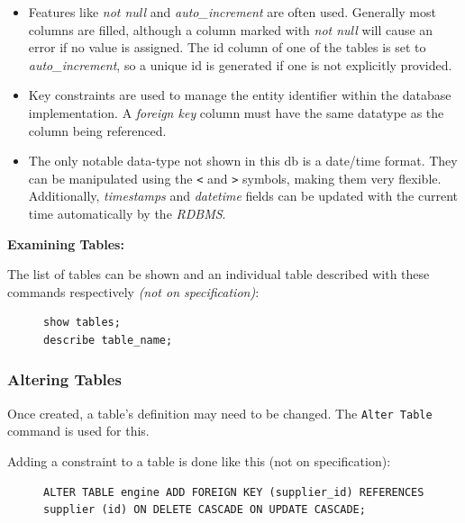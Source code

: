 \documentclass[9pt]{article}
\begin{document}
\begin{itemize}
\item Features like \emph{not null} and \emph{auto\_increment} are often used. Generally most columns are filled, although a column marked with \emph{not null} will cause an error if no value is assigned. The id column of one of the tables is set to \emph{auto\_increment}, so a unique id is generated if one is not explicitly provided.
\item Key constraints are used to manage the entity identifier within the database implementation. A \emph{foreign key} column must have the same datatype as the column being referenced.
\item The only notable data-type not shown in this db is a date/time format. They can be manipulated using the \texttt{<} and \texttt{>} symbols, making them very flexible. Additionally, \emph{timestamps} and \emph{datetime} fields can be updated with the current time automatically by the \emph{RDBMS}.
\end{itemize}

\textbf{Examining Tables:}

The list of tables can be shown and an individual table described with these commands respectively \emph{(not on specification)}:

\begin{figure}[H]
\begin{verbatim}
show tables;
describe table_name;
\end{verbatim}
\end{figure}

\subsubsection{Altering Tables}
\label{sec:org31ec7e6}

Once created, a table's definition may need to be changed. The \texttt{Alter Table} command is used for this.

Adding a constraint to a table is done like this (not on specification):

\begin{figure}[H]
\begin{verbatim}
ALTER TABLE engine ADD FOREIGN KEY (supplier_id) REFERENCES supplier (id) ON DELETE CASCADE ON UPDATE CASCADE;
\end{verbatim}
\end{figure}
\end{document}
